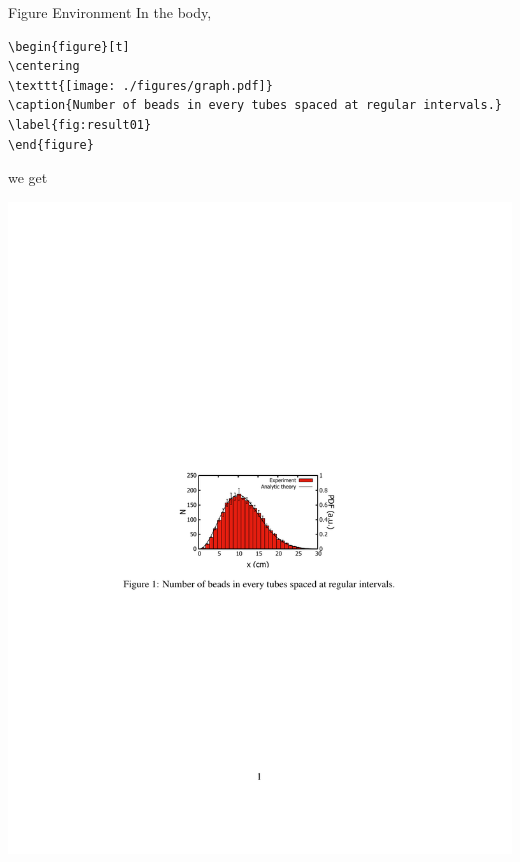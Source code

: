 \documentclass[12pt]{gshs_lecture}
\begin{document}
\begin{frame}[t,fragile]{Figure Environment}\small
In the body,
\begin{block}{}
\begin{lstlisting}
\begin{figure}[t]
\centering
\texttt{[image: ./figures/graph.pdf]}
\caption{Number of beads in every tubes spaced at regular intervals.}
\label{fig:result01}
\end{figure}
\end{lstlisting}
\end{block}
we get
\begin{center}
\begin{framed}
\includegraphics[width=\textwidth,trim={0cm 11cm 0cm 10cm},clip]{./test_article/article014.pdf}
\end{framed}
\end{center}
\end{frame}
\end{document}
